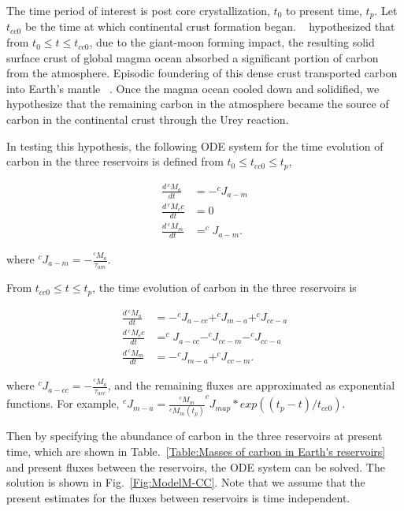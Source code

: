 The time period of interest is post core crystallization, $t_0$ to present time, $t_p$. Let $t_{cc0}$ be the time at which continental crust formation began. ~\citet{SNH-ZK:2001} hypothesized that from $t_0 \le t \le t_{cc0}$, due to the giant-moon forming impact, the resulting solid surface crust of global magma ocean absorbed a significant portion of carbon from the atmosphere. Episodic foundering of this dense crust transported carbon into Earth's mantle ~\cite{KLH-TDL-WM:2017}. Once the magma ocean cooled down and solidified, we hypothesize that the remaining carbon in the atmosphere became the source of carbon in the continental crust through the Urey reaction. 

In testing this hypothesis, the following ODE system for the time evolution of carbon in the three reservoirs is defined from $t_0 \le t_{cc0} \le t_p$, 

\begin{align}
  \frac{d\,^cM_a}{dt} &= -^cJ_{a-m} \\
  \frac{d\,^cM_cc}{dt} &= 0 \\
  \frac{d\,^cM_m}{dt} &= ^cJ_{a-m}.
\end{align}

where $^cJ_{a-m} = -\frac{^cM_a}{\tau_{am}}$.
 
From $t_{cc0} \le t \le t_p$, the time evolution of carbon in the three reservoirs is

\begin{align}
  \frac{d\,^cM_a}{dt} &= -^cJ_{a-cc} + ^cJ_{m-a} + ^cJ_{cc-a}\\
  \frac{d\,^cM_cc}{dt} &= ^cJ_{a-cc} - ^cJ_{cc-m} - ^cJ_{cc-a}\\
  \frac{d\,^cM_m}{dt} &= -^cJ_{m-a} + ^cJ_{cc-m}.
\end{align}

where $^cJ_{a-cc} = -\frac{^cM_a}{\tau_{acc}}$, and the remaining fluxes are approximated as exponential functions. For example, $^cJ_{m-a} = \frac{^cM_m}{^cM_{m}(t_p)} ^cJ_{map}*exp((t_p - t)/t_{cc0})$.

Then by specifying the abundance of carbon in the three reservoirs at present time, which are shown in Table.~\ref{Table:Masses of carbon in Earth's reservoirs} and present fluxes between the reservoirs, the ODE system can be solved. The solution is shown in Fig.~\ref{Fig:ModelM-CC}. Note that we assume that the present estimates for the fluxes between reservoirs is time independent. 

